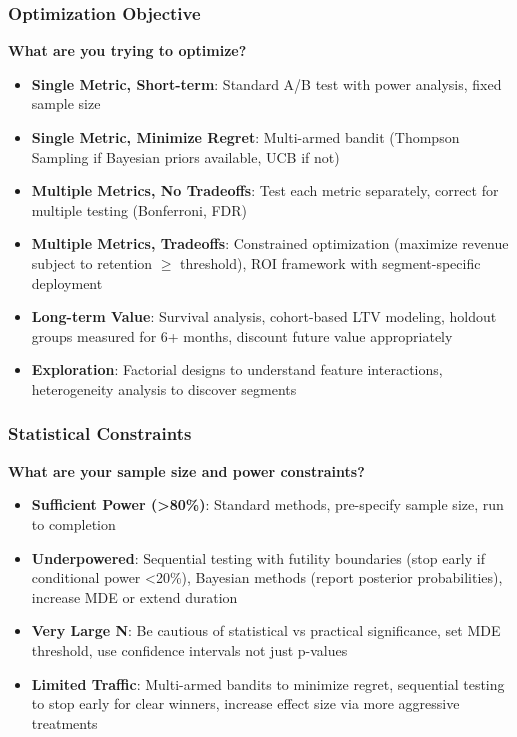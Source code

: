 \subsubsection{Optimization Objective}

\textbf{What are you trying to optimize?}

\begin{itemize}
    \item \textbf{Single Metric, Short-term}: Standard A/B test with power analysis, fixed sample size
    \item \textbf{Single Metric, Minimize Regret}: Multi-armed bandit (Thompson Sampling if Bayesian priors available, UCB if not)
    \item \textbf{Multiple Metrics, No Tradeoffs}: Test each metric separately, correct for multiple testing (Bonferroni, FDR)
    \item \textbf{Multiple Metrics, Tradeoffs}: Constrained optimization (maximize revenue subject to retention $\geq$ threshold), ROI framework with segment-specific deployment
    \item \textbf{Long-term Value}: Survival analysis, cohort-based LTV modeling, holdout groups measured for 6+ months, discount future value appropriately
    \item \textbf{Exploration}: Factorial designs to understand feature interactions, heterogeneity analysis to discover segments
\end{itemize}

\subsubsection{Statistical Constraints}

\textbf{What are your sample size and power constraints?}

\begin{itemize}
    \item \textbf{Sufficient Power (>80\%)}: Standard methods, pre-specify sample size, run to completion
    \item \textbf{Underpowered}: Sequential testing with futility boundaries (stop early if conditional power <20\%), Bayesian methods (report posterior probabilities), increase MDE or extend duration
    \item \textbf{Very Large N}: Be cautious of statistical vs practical significance, set MDE threshold, use confidence intervals not just p-values
    \item \textbf{Limited Traffic}: Multi-armed bandits to minimize regret, sequential testing to stop early for clear winners, increase effect size via more aggressive treatments
\end{itemize}

